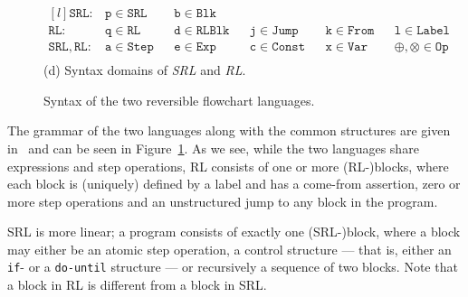 \begin{figure}[ht]
  \begin{minipage}{\textwidth}
    \center
    $$\begin{matrix*}[l]
      \mathtt{SRL}:     & \mathtt{p}\in\mathtt{SRL}  & & \mathtt{b}\in\mathtt{Blk}\\
      \mathtt{RL}:      & \mathtt{q}\in\mathtt{RL}   & & \mathtt{d}\in\mathtt{RLBlk} & & \mathtt{j}\in\mathtt{Jump}  & & \mathtt{k}\in\mathtt{From} & & \mathtt{l}\in\mathtt{Label}\\
      \mathtt{SRL, RL}: & \mathtt{a}\in\mathtt{Step} & & \mathtt{e}\in\mathtt{Exp}   & & \mathtt{c}\in\mathtt{Const} & & \mathtt{x}\in\mathtt{Var}  & & \oplus,\otimes\in\mathtt{Op}\\
    \end{matrix*}$$
    (d) Syntax domains of \textit{SRL} and \textit{RL}.
  \end{minipage}

  \caption{Syntax of the two reversible flowchart languages.}
  \label{fig:rl_srl_grammar_and_structure}

\end{figure}

The grammar of the two languages along with the common structures are given in~\cite{REV} and can be seen in Figure~\ref{fig:rl_srl_grammar_and_structure}. As we see, while the two languages share expressions and step operations, RL consists of one or more (RL-)blocks, where each block is (uniquely) defined by a label and has a come-from assertion, zero or more step operations and an unstructured jump to any block in the program.

SRL is more linear; a program consists of exactly one (SRL-)block, where a block may either be an atomic step operation, a control structure --- that is, either an \texttt{if}- or a \texttt{do-until} structure --- or recursively a sequence of two blocks. Note that a block in RL is different from a block in SRL.\

